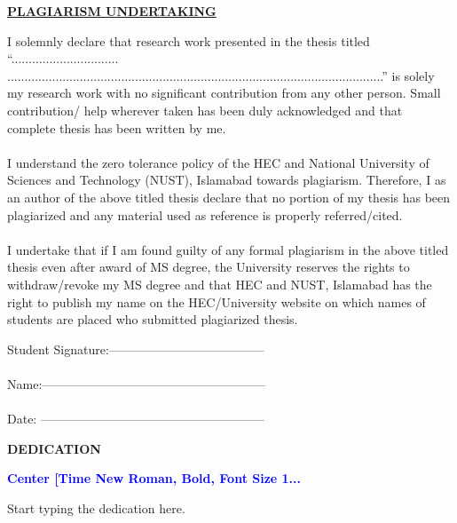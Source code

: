 \documentclass[a4paper, 12pt, twoside]{report}
\theoremstyle{definition}
\begin{document}
\NoBgThispage
  \newpage
	\thispagestyle{empty}
\begin{center}
\textbf{\underline {PLAGIARISM UNDERTAKING}}
\end{center}

I solemnly declare that research work presented in the thesis titled “...............................\\.............................................................................................................” is solely my research work with no significant contribution from any other person. Small contribution/ help wherever taken has been duly acknowledged and that complete thesis has been written by me.
\\~\\
I understand the zero tolerance policy of the HEC and National University of Sciences and Technology (NUST), Islamabad towards plagiarism. Therefore, I as an author of the above titled thesis declare that no portion of my thesis has been plagiarized and any material used as reference is properly referred/cited.\\~\\
I undertake that if I am found guilty of any formal plagiarism in the above titled thesis even after award of MS degree, the University reserves the rights to withdraw/revoke my MS degree and that HEC and NUST, Islamabad has the right to publish my name on the HEC/University website on which names of students are placed who submitted plagiarized thesis.

\begin{flushright}
Student Signature:--------------------------------------\\~\\
Name:------------------------------------------------------ \\~\\					
Date: ------------------------------------------------------ \\			\end{flushright}

\NoBgThispage  
  \newpage
	\thispagestyle{empty}
\begin{center}
\textbf {DEDICATION}
\end{center}
\begin{center}
{{\small
  \bfseries \textcolor{blue}{Center [Time New Roman, Bold, Font Size 1...}
}
}\\
\end{center}
Start typing the dedication here.
\vspace{2cm}
\end{document}
